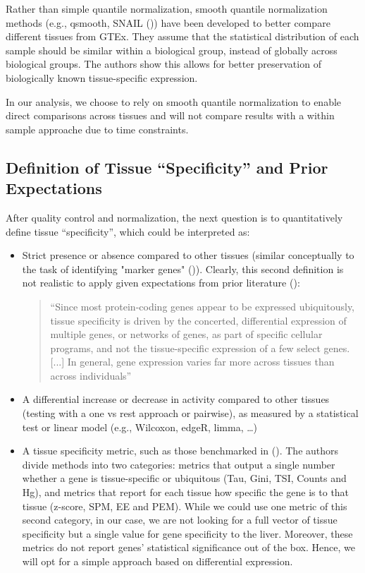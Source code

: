 \documentclass{article}
\begin{document}
Rather than simple quantile normalization, smooth quantile normalization methods (e.g., qsmooth, SNAIL (\cite{Hicks2018-gi,Hsieh2023-jf})) have been developed to better compare different tissues from GTEx. They assume that the statistical distribution of each sample should be similar within a biological group, instead of globally across biological groups. The authors show this allows for better preservation of biologically known tissue-specific expression.


In our analysis, we choose to rely on smooth quantile normalization to enable direct comparisons across tissues and will not compare results with a within sample approache due to time constraints.

\subsection{Definition of Tissue “Specificity” and Prior Expectations}

After quality control and normalization, the next question is to quantitatively define tissue “specificity”, which could be interpreted as:
\begin{itemize}
  \item Strict presence or absence compared to other tissues (similar conceptually to the task of identifying "marker genes" (\cite{Pullin2024-xv})). Clearly, this second definition is not realistic to apply given expectations from prior literature (\cite{Aguet2016-qm}):
  \begin{quote}
    “Since most protein-coding genes appear to be expressed ubiquitously, tissue specificity is driven by the concerted, differential expression of multiple genes, or networks of genes, as part of specific cellular programs, and not the tissue-specific expression of a few select genes. [...] In general, gene expression varies far more across tissues than across individuals”
  \end{quote}
  \item A differential increase or decrease in activity compared to other tissues (testing with a one vs rest approach or pairwise), as measured by a statistical test or linear model (e.g., Wilcoxon, edgeR, limma, …)
  \item A tissue specificity metric, such as those benchmarked in (\cite{Kryuchkova-Mostacci2017-vy}). The authors divide methods into two categories: metrics that output a single number whether a gene is tissue-specific or ubiquitous (Tau, Gini, TSI, Counts and Hg), and metrics that report for each tissue how specific the gene is to that tissue (z-score, SPM, EE and PEM). While we could use one metric of this second category, in our case, we are not looking for a full vector of tissue specificity but a single value for gene specificity to the liver. Moreover, these metrics do not report genes' statistical significance out of the box. Hence, we will opt for a simple approach based on differential expression.
\end{itemize}
\end{document}
